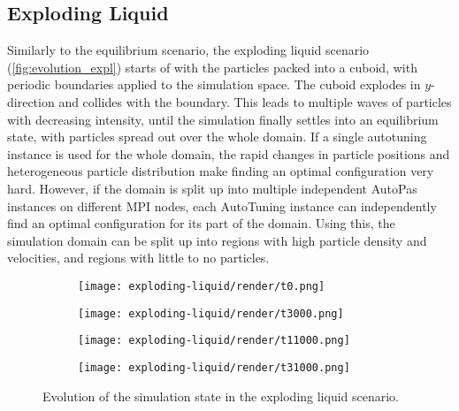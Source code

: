 \subsection{Exploding Liquid}
Similarly to the equilibrium scenario, the exploding liquid scenario (\autoref{fig:evolution_expl}) starts of with the particles packed into a cuboid, with periodic boundaries applied to the simulation space. The cuboid explodes in $y$-direction and collides with the boundary. This leads to multiple waves of particles with decreasing intensity, until the simulation finally settles into an equilibrium state, with particles spread out over the whole domain. If a single autotuning instance is used for the whole domain, the rapid changes in particle positions and heterogeneous particle distribution make finding an optimal configuration very hard. However, if the domain is split up into multiple independent AutoPas instances on different MPI nodes, each AutoTuning instance can independently find an optimal configuration for its part of the domain. Using this, the simulation domain can be split up into regions with high particle density and velocities, and regions with little to no particles.

\label{subsec:expl}
\begin{figure}[htpb]
	\centering
	\begin{subfigure}[c]{.25\textwidth}
		\vspace*{-\ht\colorbarbox} %
		\texttt{[image: exploding-liquid/render/t0.png]}
	\end{subfigure}%
	\begin{subfigure}[c]{.25\textwidth}
		\texttt{[image: exploding-liquid/render/t3000.png]}
	\end{subfigure}%
	\begin{subfigure}[c]{.25\textwidth}
		\centering
		\texttt{[image: exploding-liquid/render/t11000.png]}
	\end{subfigure}%
	\begin{subfigure}[c]{.25\textwidth}
		\centering
		\texttt{[image: exploding-liquid/render/t31000.png]}
	\end{subfigure}
	\caption{Evolution of the simulation state in the exploding liquid scenario.}
	\label{fig:evolution_expl}
\end{figure}

